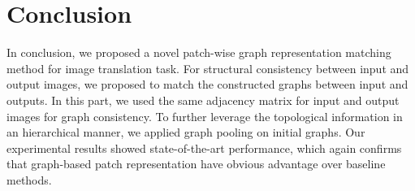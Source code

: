 \documentclass[letterpaper]{article} %
\begin{document}
\begin{table}[!t]
	\begin{center}
	\end{center}
	\caption{Quantitative results of ablation studies. Our setting shows the best performance in both of FID and KID$\times$100.}
	\label{table:ablation}
\end{table}



\section{Conclusion}
In conclusion, we proposed a novel patch-wise graph representation matching method for image translation task. For structural consistency between input and output images, we proposed to match the constructed graphs between input and outputs. In this part, we used the same adjacency matrix for input and output images for graph consistency. To further leverage the topological information in an hierarchical manner, we applied graph pooling on initial graphs. Our experimental results showed state-of-the-art performance, which again confirms that graph-based patch representation have obvious advantage over baseline methods.
\end{document}
